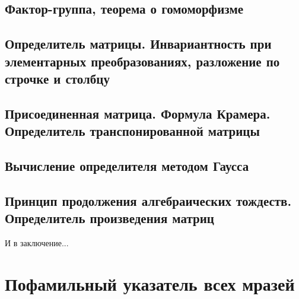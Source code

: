 \documentclass[a4paper,100pt]{article}
\theoremstyle{indented}
\theoremstyle{definition}
\theoremstyle{remark}
\begin{document}
\subsection{Фактор-группа, теорема о гомоморфизме}

\subsection{Определитель матрицы. Инвариантность при элементарных преобразованиях, разложение по строчке и столбцу}

\subsection{Присоединенная матрица. Формула Крамера. Определитель транспонированной матрицы}

\subsection{Вычисление определителя методом Гаусса}

\subsection{Принцип продолжения алгебраических тождеств. Определитель произведения матриц}



\newpage

\hypertarget{t2}{И в заключение...}



\section{Пофамильный указатель всех мразей}
\end{document}

